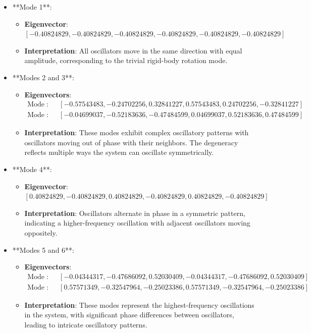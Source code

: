 \documentclass[12pt]{report} %
\begin{document}
\begin{itemize}
    \item **Mode 1**:
    \begin{itemize}
        \item \textbf{Eigenvector}: \( [-0.40824829, -0.40824829, -0.40824829, -0.40824829, -0.40824829, -0.40824829] \)
        \item \textbf{Interpretation}: All oscillators move in the same direction with equal amplitude, corresponding to the trivial rigid-body rotation mode.
    \end{itemize}
    
    \item **Modes 2 and 3**:
    \begin{itemize}
        \item \textbf{Eigenvectors}:
        \[
        \begin{aligned}
        \text{Mode 2}: & \quad [-0.57543483, -0.24702256,  0.32841227,  0.57543483,  0.24702256, -0.32841227] \\
        \text{Mode 3}: & \quad [-0.04699037, -0.52183636, -0.47484599,  0.04699037,  0.52183636,  0.47484599]
        \end{aligned}
        \]
        \item \textbf{Interpretation}: These modes exhibit complex oscillatory patterns with oscillators moving out of phase with their neighbors. The degeneracy reflects multiple ways the system can oscillate symmetrically.
    \end{itemize}
    
    \item **Mode 4**:
    \begin{itemize}
        \item \textbf{Eigenvector}: \( [0.40824829, -0.40824829, 0.40824829, -0.40824829, 0.40824829, -0.40824829] \)
        \item \textbf{Interpretation}: Oscillators alternate in phase in a symmetric pattern, indicating a higher-frequency oscillation with adjacent oscillators moving oppositely.
    \end{itemize}
    
    \item **Modes 5 and 6**:
    \begin{itemize}
        \item \textbf{Eigenvectors}:
        \[
        \begin{aligned}
        \text{Mode 5}: & \quad [-0.04344317, -0.47686092,  0.52030409, -0.04344317, -0.47686092,  0.52030409] \\
        \text{Mode 6}: & \quad [0.57571349, -0.32547964, -0.25023386,  0.57571349, -0.32547964, -0.25023386]
        \end{aligned}
        \]
        \item \textbf{Interpretation}: These modes represent the highest-frequency oscillations in the system, with significant phase differences between oscillators, leading to intricate oscillatory patterns.
    \end{itemize}
\end{itemize}
\end{document}
